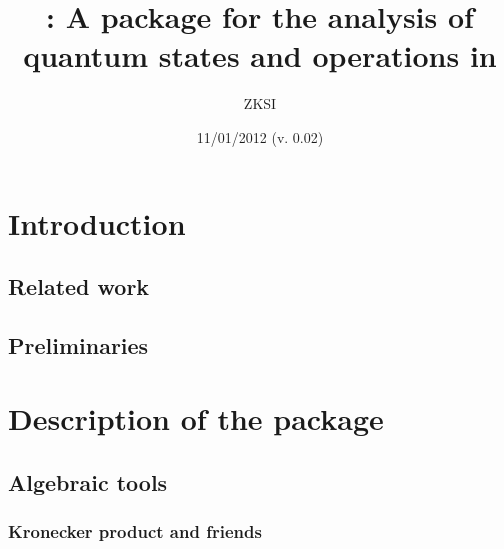 \documentclass[11pt,a4paper]{article}
\title{\qi: A package for the analysis of quantum states and operations in
\Mathematica}
\date{11/01/2012 (v. 0.02)}
\author{ZKSI}
\begin{document}
\maketitle

\section{Introduction}

\subsection{Related work}

\subsection{Preliminaries}

\section{Description of the package}

\subsection{Algebraic tools}

\subsubsection{Kronecker product and friends}

\end{document}
